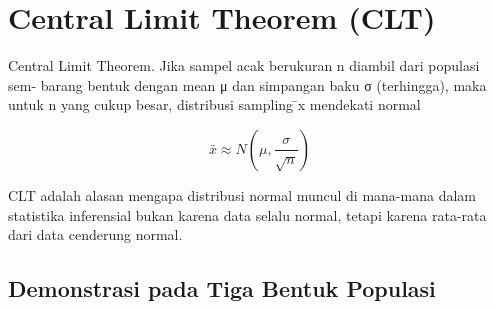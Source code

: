 \documentclass[
  indonesian,
  letterpaper,
]{book}
\begin{document}

\chapter{Central Limit Theorem (CLT)}\label{central-limit-theorem-clt}

Central Limit Theorem. Jika sampel acak berukuran n diambil dari
populasi sem- barang bentuk dengan mean μ dan simpangan baku σ
(terhingga), maka untuk n yang cukup besar, distribusi sampling ̄x
mendekati normal

\[\bar{x} \approx N\left(\mu, \dfrac{\sigma}{\sqrt{n}}\right)\]

CLT adalah alasan mengapa distribusi normal muncul di mana-mana dalam
statistika inferensial bukan karena data selalu normal, tetapi karena
rata-rata dari data cenderung normal.

\section{Demonstrasi pada Tiga Bentuk
Populasi}\label{demonstrasi-pada-tiga-bentuk-populasi}
\end{document}
